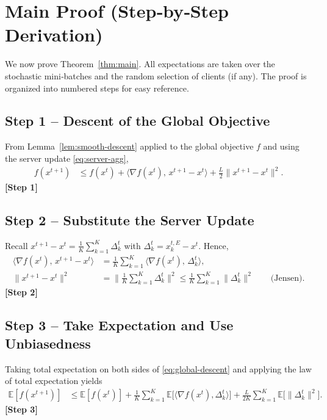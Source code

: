\documentclass{article}
\begin{document}
\section*{Main Proof (Step‑by‑Step Derivation)}
We now prove Theorem~\ref{thm:main}.  All expectations are taken over the stochastic mini‑batches and the random selection of clients (if any).  The proof is organized into numbered steps for easy reference.

\subsection*{Step 1 – Descent of the Global Objective}
From Lemma~\ref{lem:smooth-descent} applied to the global objective $f$ and using the server update \eqref{eq:server-agg},
\begin{align}
f(x^{t+1}) 
&\le f(x^{t}) + \Big\langle \nabla f(x^{t}),\, x^{t+1}-x^{t}\Big\rangle
      +\frac{L}{2}\|x^{t+1}-x^{t}\|^{2}. \label{eq:global-descent}
\end{align}
\textbf{[Step 1]}

\subsection*{Step 2 – Substitute the Server Update}
Recall $x^{t+1}-x^{t}= \frac{1}{K}\sum_{k=1}^{K}\Delta_{k}^{t}$ with $\Delta_{k}^{t}=x_{k}^{t,E}-x^{t}$.  Hence,
\begin{align}
\Big\langle \nabla f(x^{t}),\, x^{t+1}-x^{t}\Big\rangle
&= \frac{1}{K}\sum_{k=1}^{K}\big\langle \nabla f(x^{t}),\,\Delta_{k}^{t}\big\rangle, \nonumber\\
\|x^{t+1}-x^{t}\|^{2}
&= \Big\|\frac{1}{K}\sum_{k=1}^{K}\Delta_{k}^{t}\Big\|^{2}
 \le \frac{1}{K}\sum_{k=1}^{K}\|\Delta_{k}^{t}\|^{2} \qquad\text{(Jensen)}.
\end{align}
\textbf{[Step 2]}

\subsection*{Step 3 – Take Expectation and Use Unbiasedness}
Taking total expectation on both sides of \eqref{eq:global-descent} and applying the law of total expectation yields
\begin{align}
\mathbb{E}[f(x^{t+1})]
&\le \mathbb{E}[f(x^{t})]
   +\frac{1}{K}\sum_{k=1}^{K}\mathbb{E}\bigl[\langle \nabla f(x^{t}),\Delta_{k}^{t}\rangle\bigr]
   +\frac{L}{2K}\sum_{k=1}^{K}\mathbb{E}\bigl[\|\Delta_{k}^{t}\|^{2}\bigr]. \label{eq:exp-descent}
\end{align}
\textbf{[Step 3]}
\end{document}
